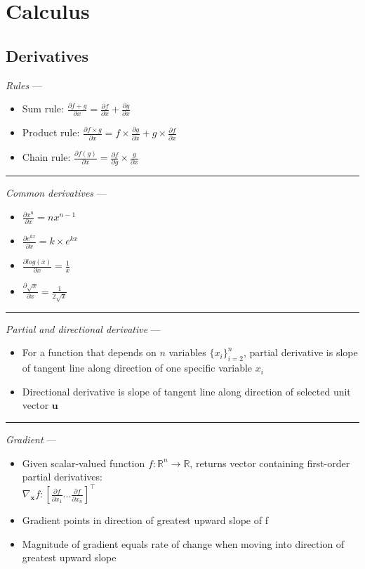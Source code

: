\section{Calculus}
\subsection*{Derivatives}
\emph{Rules} --- 
\begin{itemize}
    \item Sum rule: $\frac{\partial f + g}{\partial x} = \frac{\partial f}{\partial x} + \frac{\partial g}{\partial x}$
    \item Product rule: $\frac{\partial f \times g}{\partial x} = f \times \frac{\partial g}{\partial x} + g \times \frac{\partial f}{\partial x}$
    \item Chain rule: $\frac{\partial f(g)}{\partial x} = \frac{\partial f}{\partial g} \times \frac{g}{\partial x}$
\end{itemize}

{\color{lightgray}\hrule height 0.001mm}

\emph{Common derivatives} --- 
\begin{multicols}{2}
\begin{itemize}
    \item $\frac{\partial x^n}{\partial x} = nx^{n-1}$
    \item $\frac{\partial e^{kx}}{\partial x} = k \times e^{kx}$
    \item $\frac{\partial log(x)}{\partial x} = \frac{1}{x}$
    \item $\frac{\partial \sqrt{x}}{\partial x} = \frac{1}{2\sqrt{x}}$
\end{itemize}
\end{multicols}

{\color{lightgray}\hrule height 0.001mm}

\emph{Partial and directional derivative} --- 
\begin{itemize}
    \item For a function that depends on $n$ variables $\{x_i\}_{i=2}^n$, partial derivative is slope of tangent line along direction of one specific variable $x_i$
    \item Directional derivative is slope of tangent line along direction of selected unit vector $\boldsymbol{u}$
\end{itemize}

{\color{lightgray}\hrule height 0.001mm}

\emph{Gradient} --- 
\begin{itemize}
    \item Given scalar-valued function $f: \mathbb{R}^{n} \rightarrow \mathbb{R}$, returns vector containing first-order partial derivatives:\\
    $\nabla_{\boldsymbol{x}} f: [\frac{\partial f}{\partial x_1} ... \frac{\partial f}{\partial x_n}]^\intercal$
    \item Gradient points in direction of greatest upward slope of f \item Magnitude of gradient equals rate of change when moving into direction of greatest upward slope 
\end{itemize}

